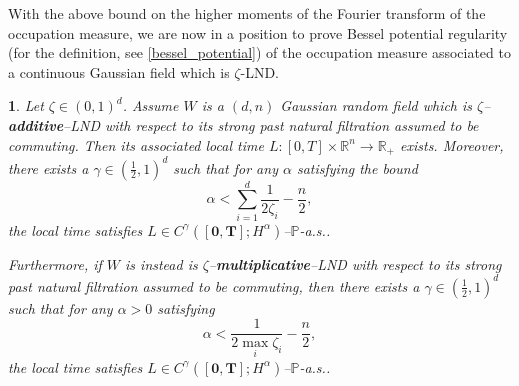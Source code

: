 \documentclass[11pt,oneside,english,reqno]{amsart}
\numberwithin{equation}{section}
\numberwithin{figure}{section}
\theoremstyle{plain}
\newtheorem{thm}{\protect\theoremname}
\theoremstyle{definition}
\theoremstyle{remark}
\theoremstyle{plain}
\theoremstyle{plain}
\theoremstyle{plain}
\theoremstyle{plain}
\theoremstyle{plain}
\providecommand{\theoremname}{Theorem}
\newcommand{\PP}{\mathbb{P}}
\newcommand{\RR}{\mathbb{R}}
\newcommand{\bT}{\mathbf{T}}
\begin{document}
With the above bound on the higher moments of the Fourier transform of the occupation measure, we are now in a position to prove Bessel potential regularity (for the definition, see \eqref{bessel_potential}) of the occupation measure associated to a continuous Gaussian field which is $\zeta$-LND. 


\begin{thm}
\label{additive LND local time}
Let $\zeta\in (0,1)^d$. Assume $W$ is a $(d, n)$ Gaussian random field which is $\zeta$--{\bf additive}--LND with respect to its strong past natural filtration assumed to be commuting. Then its associated local time $L:[0,T]\times \RR^n \rightarrow \RR_+$ exists. Moreover, there exists a $\gamma\in (\frac{1}{2},1)^d$  such that for any $\alpha$ satisfying the bound 
\begin{equation}
\label{additive alpha}
\alpha<\sum_{i=1}^d \frac{1}{2\zeta_i}-\frac{n}{2}, 
\end{equation}
the local time satisfies $L\in C^\gamma([\mathbf{0},\bT];H^\alpha)$--$\PP$-a.s..

Furthermore, if $W$ is instead is  $\zeta$--{\bf multiplicative}--LND with respect to its strong past natural filtration assumed to be commuting, then there exists a $\gamma\in (\frac{1}{2},1)^d$ such that for any $\alpha>0$ satisfying
\begin{equation}
    \alpha< \frac{1}{2\max_i \zeta_i  }-\frac{n}{2},
    \label{multi alpha}
\end{equation}
the local time satisfies $L\in C^\gamma([\mathbf{0},\bT];H^\alpha)$--$\PP$-a.s..
\end{thm}
\end{document}
